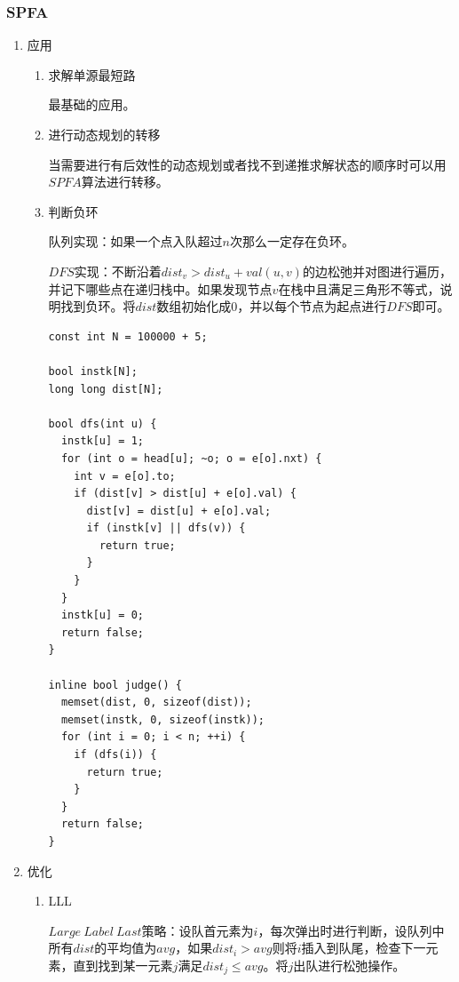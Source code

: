 \documentclass[11pt]{article}
\begin{document}
\subsubsection{SPFA}
\label{sec:org0999ccc}
\begin{enumerate}
\item 应用
\label{sec:org1f63bb0}

\begin{enumerate}
\item 求解单源最短路
\label{sec:orgdc16b7d}

最基础的应用。

\item 进行动态规划的转移
\label{sec:orgc1c4b90}

当需要进行有后效性的动态规划或者找不到递推求解状态的顺序时可以用\(SPFA\)算法进行转移。

\item 判断负环
\label{sec:org6bd9243}

队列实现：如果一个点入队超过\(n\)次那么一定存在负环。

\(DFS\)实现：不断沿着\(dist_v>dist_u+val(u,v)\)的边松弛并对图进行遍历，并记下哪些点在递归栈中。如果发现节点\(v\)在栈中且满足三角形不等式，说明找到负环。将\(dist\)数组初始化成\(0\)，并以每个节点为起点进行\(DFS\)即可。

\begin{verbatim}
const int N = 100000 + 5;

bool instk[N];
long long dist[N];

bool dfs(int u) {
  instk[u] = 1;
  for (int o = head[u]; ~o; o = e[o].nxt) {
    int v = e[o].to;
    if (dist[v] > dist[u] + e[o].val) {
      dist[v] = dist[u] + e[o].val;
      if (instk[v] || dfs(v)) {
        return true;
      }
    }
  }
  instk[u] = 0;
  return false;
}

inline bool judge() {
  memset(dist, 0, sizeof(dist));
  memset(instk, 0, sizeof(instk));
  for (int i = 0; i < n; ++i) {
    if (dfs(i)) {
      return true;
    }
  }
  return false;
}
\end{verbatim}
\end{enumerate}

\item 优化
\label{sec:org89a9511}
\begin{enumerate}
\item LLL
\label{sec:org7c3de9e}

\(Large\ Label\ Last\)策略：设队首元素为\(i\)，每次弹出时进行判断，设队列中所有\(dist\)的平均值为\(avg\)，如果\(dist_i>avg\)则将\(i\)插入到队尾，检查下一元素，直到找到某一元素\(j\)满足\(dist_j \leq avg\)。将\(j\)出队进行松弛操作。


\end{enumerate}
\end{enumerate}
\end{document}
